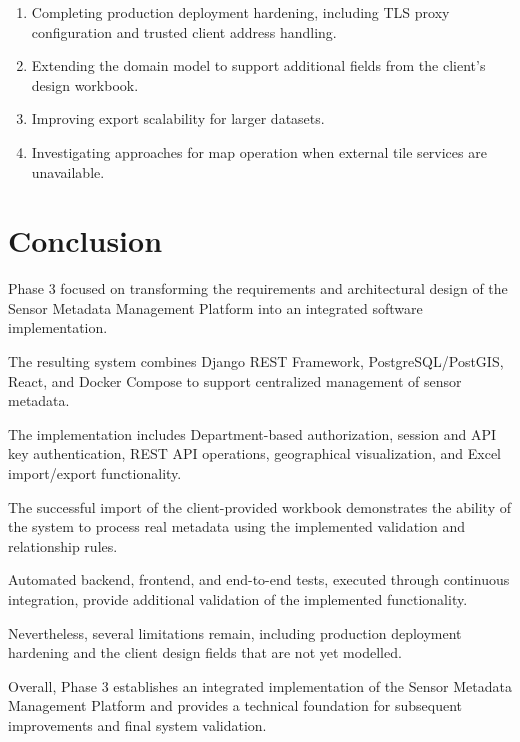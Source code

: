 \documentclass[11pt,a4paper]{article}
\begin{document}
\begin{enumerate}

    \item Completing production deployment
    hardening, including TLS proxy
    configuration and trusted client
    address handling.

    \item Extending the domain model
    to support additional fields
    from the client's design workbook.

    \item Improving export scalability
    for larger datasets.

    \item Investigating approaches
    for map operation when external
    tile services are unavailable.

\end{enumerate}


\section{Conclusion}

Phase 3 focused on transforming
the requirements and architectural
design of the Sensor Metadata Management
Platform into an integrated software
implementation.

The resulting system combines
Django REST Framework, PostgreSQL/PostGIS,
React, and Docker Compose to support
centralized management of sensor metadata.

The implementation includes
Department-based authorization,
session and API key authentication,
REST API operations, geographical
visualization, and Excel import/export
functionality.

The successful import of the
client-provided workbook demonstrates
the ability of the system to process
real metadata using the implemented
validation and relationship rules.

Automated backend, frontend, and
end-to-end tests, executed through
continuous integration, provide
additional validation of the
implemented functionality.

Nevertheless, several limitations
remain, including production deployment
hardening and the client design fields
that are not yet modelled.

Overall, Phase 3 establishes an
integrated implementation of the
Sensor Metadata Management Platform
and provides a technical foundation
for subsequent improvements and
final system validation.
\end{document}
